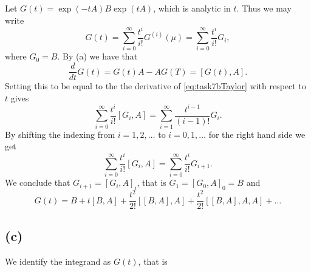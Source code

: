 Let $G(t) = \exp(-tA)B\exp(tA)$, which is analytic in $t$. Thus we may write
\begin{equation}
  \label{eq:task7bTaylor}
G(t) = \sum\limits_{i = 0}^{\infty}\frac{t^{i}}{i!} G^{(i)}(\mu)=\sum\limits_{i = 0}^{\infty}\frac{t^{i}}{i!} G_{i},
\end{equation}
where $G_{0} = B$.
By (a) we have that
\begin{equation}
  \frac{d}{dt}G(t) = G(t)A-AG(T) = [G(t),A].
\end{equation}
Setting this to be equal to the the derivative of \eqref{eq:task7bTaylor} with respect to $t$ gives
\begin{equation}
\sum\limits_{i = 0}^{\infty}\frac{t^{i}}{i!} [G_{i},A] = \sum\limits_{i = 1}^{\infty}\frac{t^{i-1}}{(i-1)!} G_{i}.
\end{equation}
By shifting the indexing from $i = 1,2,\ldots $ to $i = 0,1,\ldots$ for the right hand side we get
\begin{equation}
\sum\limits_{i = 0}^{\infty}\frac{t^{i}}{i!} [G_{i},A] = \sum\limits_{i = 0}^{\infty}\frac{t^{i}}{i!} G_{i+1}.
\end{equation}
We conclude that $G_{i+1} = [G_{i},A]_{i}$, that is $G_{1} = [G_{0},A]_{0} = B$ and
\begin{equation}
  G(t) = B + t[B,A]+\frac{t^{2}}{2!}[[B,A],A]+\frac{t^{2}}{2!}[[B,A],A,A]+\ldots
\end{equation}

\subsection*{(c)}
We identify the integrand as $G(t)$, that is

